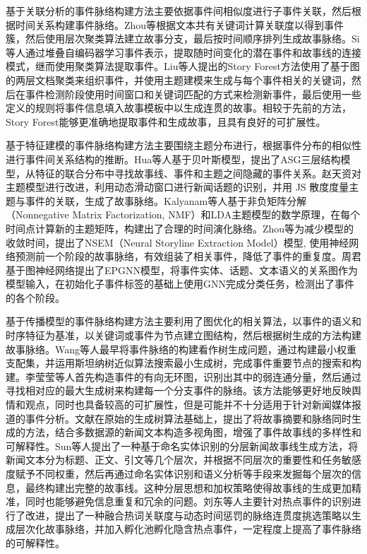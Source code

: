 基于关联分析的事件脉络构建方法主要依据事件间相似度进行子事件关联，然后根据时间关系构建事件脉络。Zhou等\cite{}根据文本共有关键词计算关联度以得到事件簇，然后使用层次聚类算法建立故事分支，最后按时间顺序排列生成故事脉络。Si等人\cite{CorAna-Si}通过堆叠自编码器学习事件表示，提取随时间变化的潜在事件和故事线的连接模式，继而使用聚类算法提取事件。Liu等人\cite{CorAna-Liu}提出的Story Forest方法使用了基于图的两层文档聚类来组织事件，并使用主题建模来生成与每个事件相关的关键词，然后在事件检测阶段使用时间窗口和关键词匹配的方式来检测新事件，最后使用一些定义的规则将事件信息填入故事模板中以生成连贯的故事。相较于先前的方法，Story Forest能够更准确地提取事件和生成故事，且具有良好的可扩展性。

基于特征建模的事件脉络构建方法主要围绕主题分布进行，根据事件分布的相似性进行事件间关系结构的推断。Hua等人\cite{FeaModel-Hua}基于贝叶斯模型，提出了ASG三层结构模型，从特征的联合分布中寻找故事线、事件和主题之间隐藏的事件关系。赵天资\cite{FeaModel-Zhao}对主题模型进行改进，利用动态滑动窗口进行新闻话题的识别，并用 JS 散度度量主题与事件的关联，生成了故事脉络。Kalyanam等人\cite{FeaModel-Kalyanam}基于非负矩阵分解（Nonnegative Matrix Factorization, NMF）和LDA主题模型的数学原理，在每个时间点计算新的主题矩阵，构建出了合理的时间演化脉络。Zhou等\cite{FeaModel-Zhou}为减少模型的收敛时间，提出了NSEM（Neural Storyline Extraction Model）模型, 使用神经网络预测前一个阶段的故事脉络，有效组装了相关事件，降低了事件的重复度。周君\cite{FeaModel-ZhouJun}基于图神经网络提出了EPGNN模型，将事件实体、话题、文本语义的关系图作为模型输入，在初始化子事件标签的基础上使用GNN完成分类任务，检测出了事件的各个阶段。

基于传播模型的事件脉络构建方法主要利用了图优化的相关算法，以事件的语义和时序特征为基准，以关键词或事件为节点建立图结构，然后根据树生成的方法构建故事脉络。Wang等人\cite{GraphModel-Wang}最早将事件脉络的构建看作树生成问题，通过构建最小权重支配集，并运用斯坦纳树近似算法搜索最小生成树，完成事件重要节点的搜索和构建。李莹莹等人\cite{GraphModel-Li}首先构造事件的有向无环图，识别出其中的弱连通分量，然后通过寻找相对应的最大生成树来构建每一个分支事件的脉络。该方法能够更好地反映舆情和观点，同时也具备较高的可扩展性，但是可能并不十分适用于针对新闻媒体报道的事件分析。文献\cite{GraphModel-Lin}在原始的生成树算法基础上，提出了将故事摘要和脉络同时生成的方法，结合多数据源的新闻文本构造多视角图，增强了事件故事线的多样性和可解释性。Sun等人\cite{GraphModel-Sun}提出了一种基于命名实体识别的分层新闻故事线生成方法，将新闻文本分为标题、正文、引文等几个层次，并根据不同层次的重要性和任务敏感度赋予不同权重，然后再通过命名实体识别和语义分析等手段来发掘每个层次的信息，最终构建出完整的故事线。这种分层思想和加权策略使得故事线的生成更加精准，同时也能够避免信息重复和冗余的问题。刘东等人\cite{GraphModel-LiuDong}主要针对热点事件的识别进行了改进，提出了一种融合热词关联度与动态时间惩罚的脉络连贯度挑选策略以生成层次化故事脉络，并加入孵化池孵化隐含热点事件，一定程度上提高了事件脉络的可解释性。

